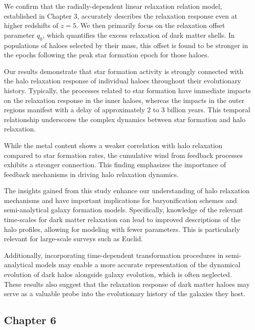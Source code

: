 \documentclass[a4paper, 12pt, oneside]{Thesis}  %
\begin{document}
We confirm that the radially-dependent linear relaxation relation model, established in Chapter 3, accurately describes the relaxation response even at higher redshifts of \( z=5 \). We then primarily focus on the relaxation offset parameter \( q_0 \), which quantifies the excess relaxation of dark matter shells. In populations of haloes selected by their mass, this offset is found to be stronger in the epochs following the peak star formation epoch for those haloes.

Our results demonstrate that star formation activity is strongly connected with the halo relaxation response of individual haloes throughout their evolutionary history. Typically, the processes related to star formation have immediate impacts on the relaxation response in the inner haloes, whereas the impacts in the outer regions manifest with a delay of approximately 2 to 3 billion years. This temporal relationship underscores the complex dynamics between star formation and halo relaxation.

While the metal content shows a weaker correlation with halo relaxation compared to star formation rates, the cumulative wind from feedback processes exhibits a stronger connection. This finding emphasizes the importance of feedback mechanisms in driving halo relaxation dynamics.

The insights gained from this study enhance our understanding of halo relaxation mechanisms and have important implications for baryonification schemes and semi-analytical galaxy formation models. Specifically, knowledge of the relevant time-scales for dark matter relaxation can lead to improved descriptions of the halo profiles, allowing for modeling with fewer parameters. This is particularly relevant for large-scale surveys such as Euclid.

Additionally, incorporating time-dependent transformation procedures in semi-analytical models may enable a more accurate representation of the dynamical evolution of dark halos alongside galaxy evolution, which is often neglected. These results also suggest that the relaxation response of dark matter haloes may serve as a valuable probe into the evolutionary history of the galaxies they host.



\subsection*{Chapter 6}
\end{document}
